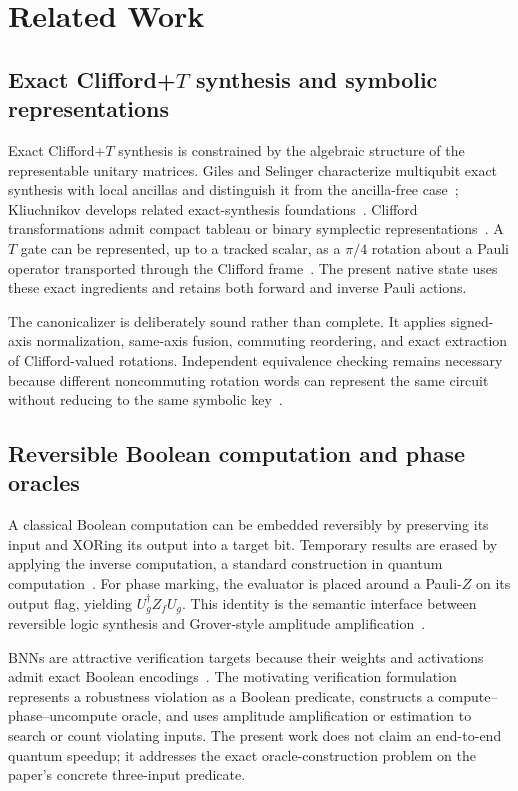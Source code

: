 \section{Related Work}

\subsection{Exact Clifford+$T$ synthesis and symbolic representations}
Exact Clifford+$T$ synthesis is constrained by the algebraic structure of the representable unitary matrices.  Giles and Selinger characterize multiqubit exact synthesis with local ancillas and distinguish it from the ancilla-free case~\cite{giles2013exact}; Kliuchnikov develops related exact-synthesis foundations~\cite{kliuchnikov2013synthesis}.  Clifford transformations admit compact tableau or binary symplectic representations~\cite{aaronson2004improved,bravyi2021hadamard}.  A $T$ gate can be represented, up to a tracked scalar, as a $\pi/4$ rotation about a Pauli operator transported through the Clifford frame~\cite{zhang2019optimizing,vandaele2023optimal}.  The present native state uses these exact ingredients and retains both forward and inverse Pauli actions.

The canonicalizer is deliberately sound rather than complete.  It applies signed-axis normalization, same-axis fusion, commuting reordering, and exact extraction of Clifford-valued rotations.  Independent equivalence checking remains necessary because different noncommuting rotation words can represent the same circuit without reducing to the same symbolic key~\cite{burgholzer2020advanced}.

\subsection{Reversible Boolean computation and phase oracles}
A classical Boolean computation can be embedded reversibly by preserving its input and XORing its output into a target bit.  Temporary results are erased by applying the inverse computation, a standard construction in quantum computation~\cite{nielsen2010quantum}.  For phase marking, the evaluator is placed around a Pauli-$Z$ on its output flag, yielding $U_g^\dagger Z_fU_g$.  This identity is the semantic interface between reversible logic synthesis and Grover-style amplitude amplification~\cite{grover1996fast,brassard2002amplitude}.

BNNs are attractive verification targets because their weights and activations admit exact Boolean encodings~\cite{courbariaux2016binarized,narodytska2018verifying}.  The motivating verification formulation represents a robustness violation as a Boolean predicate, constructs a compute--phase--uncompute oracle, and uses amplitude amplification or estimation to search or count violating inputs.  The present work does not claim an end-to-end quantum speedup; it addresses the exact oracle-construction problem on the paper's concrete three-input predicate.

